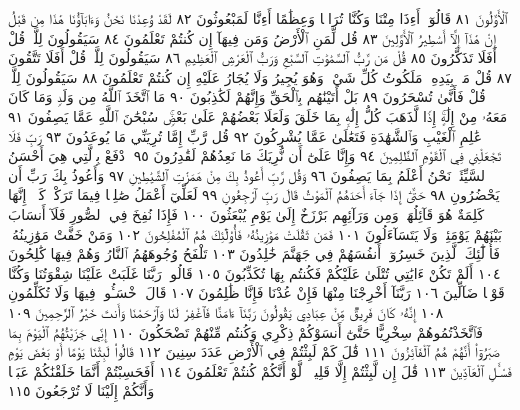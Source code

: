 ٱلْأَوَّلُونَ ٨١ قَالُوٓا۟ أَءِذَا مِتْنَا وَكُنَّا تُرَابࣰا وَعِظَٰمًا أَءِنَّا
لَمَبْعُوثُونَ ٨٢ لَقَدْ وُعِدْنَا نَحْنُ وَءَابَآؤُنَا هَٰذَا مِن قَبْلُ
إِنْ هَٰذَآ إِلَّآ أَسَٰطِيرُ ٱلْأَوَّلِينَ ٨٣ قُل لِّمَنِ ٱلْأَرْضُ وَمَن
فِيهَآ إِن كُنتُمْ تَعْلَمُونَ ٨٤ سَيَقُولُونَ لِلَّهِۚ قُلْ أَفَلَا
تَذَكَّرُونَ ٨٥ قُلْ مَن رَّبُّ ٱلسَّمَٰوَٰتِ ٱلسَّبْعِ وَرَبُّ ٱلْعَرْشِ
ٱلْعَظِيمِ ٨٦ سَيَقُولُونَ لِلَّهِۚ قُلْ أَفَلَا تَتَّقُونَ ٨٧ قُلْ مَنۢ
بِيَدِهِۦ مَلَكُوتُ كُلِّ شَيْءࣲ وَهُوَ يُجِيرُ وَلَا يُجَارُ عَلَيْهِ إِن
كُنتُمْ تَعْلَمُونَ ٨٨ سَيَقُولُونَ لِلَّهِۚ قُلْ فَأَنَّىٰ تُسْحَرُونَ ٨٩
بَلْ أَتَيْنَٰهُم بِٱلْحَقِّ وَإِنَّهُمْ لَكَٰذِبُونَ ٩٠ مَا ٱتَّخَذَ ٱللَّهُ مِن
وَلَدࣲ وَمَا كَانَ مَعَهُۥ مِنْ إِلَٰهٍۚ إِذࣰا لَّذَهَبَ كُلُّ إِلَٰهِۭ بِمَا خَلَقَ
وَلَعَلَا بَعْضُهُمْ عَلَىٰ بَعْضࣲۚ سُبْحَٰنَ ٱللَّهِ عَمَّا يَصِفُونَ ٩١
عَٰلِمِ ٱلْغَيْبِ وَٱلشَّهَٰدَةِ فَتَعَٰلَىٰ عَمَّا يُشْرِكُونَ ٩٢ قُل رَّبِّ
إِمَّا تُرِيَنِّي مَا يُوعَدُونَ ٩٣ رَبِّ فَلَا تَجْعَلْنِي فِي ٱلْقَوْمِ ٱلظَّٰلِمِينَ ٩٤
وَإِنَّا عَلَىٰٓ أَن نُّرِيَكَ مَا نَعِدُهُمْ لَقَٰدِرُونَ ٩٥ ٱدْفَعْ بِٱلَّتِي
هِيَ أَحْسَنُ ٱلسَّيِّئَةَۚ نَحْنُ أَعْلَمُ بِمَا يَصِفُونَ ٩٦ وَقُل رَّبِّ
أَعُوذُ بِكَ مِنْ هَمَزَٰتِ ٱلشَّيَٰطِينِ ٩٧ وَأَعُوذُ بِكَ رَبِّ أَن
يَحْضُرُونِ ٩٨ حَتَّىٰٓ إِذَا جَآءَ أَحَدَهُمُ ٱلْمَوْتُ قَالَ رَبِّ
ٱرْجِعُونِ ٩٩ لَعَلِّيٓ أَعْمَلُ صَٰلِحࣰا فِيمَا تَرَكْتُۚ كَلَّآۚ إِنَّهَا
كَلِمَةٌ هُوَ قَآئِلُهَاۖ وَمِن وَرَآئِهِم بَرْزَخٌ إِلَىٰ يَوْمِ يُبْعَثُونَ ١٠٠
فَإِذَا نُفِخَ فِي ٱلصُّورِ فَلَآ أَنسَابَ بَيْنَهُمْ يَوْمَئِذࣲ وَلَا يَتَسَآءَلُونَ ١٠١
فَمَن ثَقُلَتْ مَوَٰزِينُهُۥ فَأُو۟لَٰٓئِكَ هُمُ ٱلْمُفْلِحُونَ ١٠٢ وَمَنْ
خَفَّتْ مَوَٰزِينُهُۥ فَأُو۟لَٰٓئِكَ ٱلَّذِينَ خَسِرُوٓا۟ أَنفُسَهُمْ فِي جَهَنَّمَ
خَٰلِدُونَ ١٠٣ تَلْفَحُ وُجُوهَهُمُ ٱلنَّارُ وَهُمْ فِيهَا كَٰلِحُونَ ١٠٤
أَلَمْ تَكُنْ ءَايَٰتِي تُتْلَىٰ عَلَيْكُمْ فَكُنتُم بِهَا تُكَذِّبُونَ ١٠٥
قَالُوا۟ رَبَّنَا غَلَبَتْ عَلَيْنَا شِقْوَتُنَا وَكُنَّا قَوْمࣰا ضَآلِّينَ ١٠٦
رَبَّنَآ أَخْرِجْنَا مِنْهَا فَإِنْ عُدْنَا فَإِنَّا ظَٰلِمُونَ ١٠٧
قَالَ ٱخْسَـُٔوا۟ فِيهَا وَلَا تُكَلِّمُونِ ١٠٨ إِنَّهُۥ كَانَ فَرِيقࣱ مِّنْ
عِبَادِي يَقُولُونَ رَبَّنَآ ءَامَنَّا فَٱغْفِرْ لَنَا وَٱرْحَمْنَا وَأَنتَ
خَيْرُ ٱلرَّٰحِمِينَ ١٠٩ فَٱتَّخَذْتُمُوهُمْ سِخْرِيًّا حَتَّىٰٓ أَنسَوْكُمْ ذِكْرِي
وَكُنتُم مِّنْهُمْ تَضْحَكُونَ ١١٠ إِنِّي جَزَيْتُهُمُ ٱلْيَوْمَ بِمَا صَبَرُوٓا۟
أَنَّهُمْ هُمُ ٱلْفَآئِزُونَ ١١١ قَٰلَ كَمْ لَبِثْتُمْ فِي ٱلْأَرْضِ عَدَدَ
سِنِينَ ١١٢ قَالُوا۟ لَبِثْنَا يَوْمًا أَوْ بَعْضَ يَوْمࣲ فَسْـَٔلِ ٱلْعَآدِّينَ ١١٣
قَٰلَ إِن لَّبِثْتُمْ إِلَّا قَلِيلࣰاۖ لَّوْ أَنَّكُمْ كُنتُمْ تَعْلَمُونَ ١١٤
أَفَحَسِبْتُمْ أَنَّمَا خَلَقْنَٰكُمْ عَبَثࣰا وَأَنَّكُمْ إِلَيْنَا لَا تُرْجَعُونَ ١١٥
